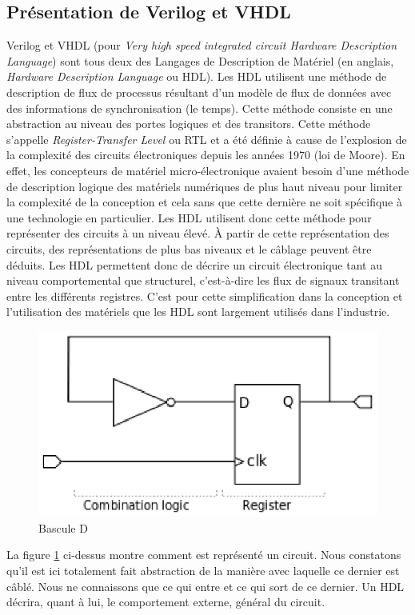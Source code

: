 \subsection{Présentation de Verilog et VHDL}
Verilog et VHDL (pour \textit{Very high speed integrated circuit Hardware Description Language}) sont tous deux des Langages de Description de Matériel (en anglais, \textit{Hardware Description Language} ou HDL). Les HDL utilisent une méthode de description de flux de processus résultant d'un modèle de flux de données avec des informations de synchronisation (le temps). Cette méthode consiste en une abstraction au niveau des portes logiques et des transitors. Cette méthode s'appelle \textit{Register-Transfer Level} ou RTL et a été définie à cause de l'explosion de la complexité des circuits électroniques depuis les années 1970 (loi de Moore). En effet, les concepteurs de matériel micro-électronique avaient besoin d'une méthode de description logique des matériels numériques de plus haut niveau pour limiter la complexité de la conception et cela sans que cette dernière ne soit spécifique à une technologie en particulier. Les HDL utilisent donc cette méthode pour représenter des circuits à un niveau élevé. À partir de cette représentation des circuits, des représentations de plus bas niveaux et le câblage peuvent être déduits. Les HDL permettent donc de décrire un circuit électronique tant au niveau comportemental que structurel, c'est-à-dire les flux de signaux transitant entre les différents registres. C'est pour cette simplification dans la conception et l'utilisation des matériels que les HDL sont largement utilisés dans l'industrie.
\newpage

\begin{figure}
\begin{center}
\includegraphics[scale=0.8]{rtl_example.eps}
\end{center}
\caption{Bascule D}
\label{BasculeD}
\end{figure}
La figure \ref{BasculeD} ci-dessus montre comment est représenté un circuit. Nous constatons qu'il est ici totalement fait abstraction de la manière avec laquelle ce dernier est câblé. Nous ne connaissons que ce qui entre et ce qui sort de ce dernier. Un HDL décrira, quant à lui, le {\og}comportement{\fg} externe, général du circuit.

